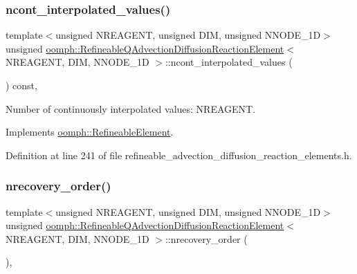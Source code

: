 \subsubsection{\texorpdfstring{ncont\+\_\+interpolated\+\_\+values()}{ncont\_interpolated\_values()}}
{\footnotesize\ttfamily template$<$unsigned N\+R\+E\+A\+G\+E\+NT, unsigned D\+IM, unsigned N\+N\+O\+D\+E\+\_\+1D$>$ \\
unsigned \hyperlink{classoomph_1_1RefineableQAdvectionDiffusionReactionElement}{oomph\+::\+Refineable\+Q\+Advection\+Diffusion\+Reaction\+Element}$<$ N\+R\+E\+A\+G\+E\+NT, D\+IM, N\+N\+O\+D\+E\+\_\+1D $>$\+::ncont\+\_\+interpolated\+\_\+values (\begin{DoxyParamCaption}{ }\end{DoxyParamCaption}) const\hspace{0.3cm}{\ttfamily [inline]}, {\ttfamily [virtual]}}



Number of continuously interpolated values\+: N\+R\+E\+A\+G\+E\+NT. 



Implements \hyperlink{classoomph_1_1RefineableElement_a53e171a18c9f43f1db90a6876516a073}{oomph\+::\+Refineable\+Element}.



Definition at line 241 of file refineable\+\_\+advection\+\_\+diffusion\+\_\+reaction\+\_\+elements.\+h.

\mbox{\label{classoomph_1_1RefineableQAdvectionDiffusionReactionElement_a836f98dc3fd33e58860d243023a0f991}} 
\subsubsection{\texorpdfstring{nrecovery\+\_\+order()}{nrecovery\_order()}}
{\footnotesize\ttfamily template$<$unsigned N\+R\+E\+A\+G\+E\+NT, unsigned D\+IM, unsigned N\+N\+O\+D\+E\+\_\+1D$>$ \\
unsigned \hyperlink{classoomph_1_1RefineableQAdvectionDiffusionReactionElement}{oomph\+::\+Refineable\+Q\+Advection\+Diffusion\+Reaction\+Element}$<$ N\+R\+E\+A\+G\+E\+NT, D\+IM, N\+N\+O\+D\+E\+\_\+1D $>$\+::nrecovery\+\_\+order (\begin{DoxyParamCaption}{ }\end{DoxyParamCaption})\hspace{0.3cm}{\ttfamily [inline]}, {\ttfamily [virtual]}}




